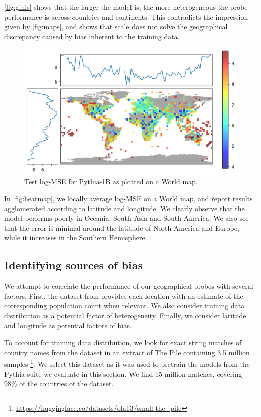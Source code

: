 \autoref{fig:ginis} shows that the larger the model is, the more heterogeneous the probe performance is across countries and continents. This contradicts the impression given by \autoref{fig:maps}, and shows that scale does not solve the geographical discrepancy caused by bias inherent to the training data.

\begin{figure}[ht]
    \centering
    \includegraphics[width=0.9\linewidth]{sources/part_1/geographical/imgs/heatmap_100_50.png}
    \caption{Test log-MSE for Pythia-1B as plotted on a World map.}
    \label{fig:heatmap}
\end{figure}

In \autoref{fig:heatmap}, we locally average log-MSE on a World map, and report results agglomerated according to latitude and longitude. We clearly observe that the model performs poorly in Oceania, South Asia and South America. We also see that the error is minimal around the latitude of North America and Europe, while it increases in the Southern Hemisphere.

\subsection{Identifying sources of bias}
We attempt to correlate the performance of our geographical probes with several factors. First, the dataset from \citep{gurnee2023language} provides each location with an estimate of the corresponding population count when relevant. We also consider training data distribution as a potential factor of heterogeneity. Finally, we consider latitude and longitude as potential factors of bias.


To account for training data distribution, we look for exact string matches of country names from the \citet{gurnee2023language} dataset in an extract of The Pile \citep{gao2020pile} containing 3.5 million samples \footnote{\url{https://huggingface.co/datasets/ola13/small-the\_pile}}. We select this dataset as it was used to pretrain the models from the Pythia suite \citep{pythia} we evaluate in this section. We find 15 million matches, covering 98\% of the countries of the dataset.

